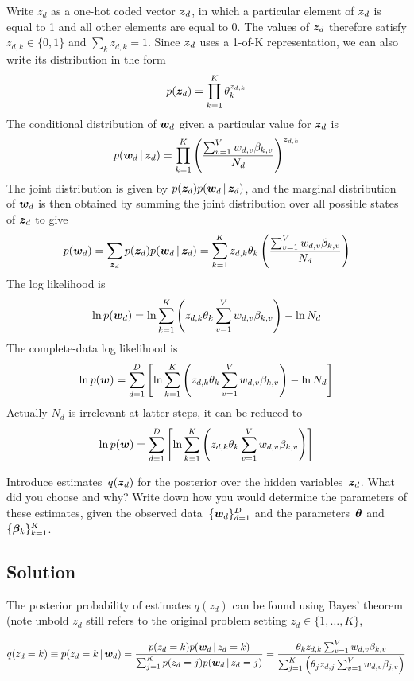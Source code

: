 \documentclass[submit]{harvardml}
\begin{document}
Write $z_d$ as a one-hot coded vector $\boldsymbol{z}_d$, in which a particular element of $\boldsymbol{z}_d$ is equal to 1 and all other elements are equal to 0. The values of $\boldsymbol{z}_d$ therefore satisfy $z_{d,k} \in \{0,1\}$ and $\sum_k z_{d,k} = 1$. Since $\boldsymbol{z}_d$ uses a 1-of-K representation, we can also write its distribution in the form
$$ p(\boldsymbol{z}_d) = \prod_{k=1}^K \theta_k^{z_{d,k}} $$ 
The conditional distribution of $\boldsymbol{w}_d$ given a particular value for $\boldsymbol{z}_d$ is
$$ p(\boldsymbol{w}_d \,|\, \boldsymbol{z}_d) = \prod_{k=1}^K \left( \frac{\sum_{v=1}^V{w_{d,v}\beta_{k,v}}}{N_d} \right)^{z_{d,k}} $$
The joint distribution is given by $p(\boldsymbol{z}_d)p(\boldsymbol{w}_d\,|\,\boldsymbol{z}_d)$, and the marginal distribution of $\boldsymbol{w}_d$ is then obtained by summing the joint distribution over all possible states of $\boldsymbol{z}_d$ to give
$$ p(\boldsymbol{w}_d) = \sum_{\boldsymbol{z}_d} p(\boldsymbol{z}_d)p(\boldsymbol{w}_d\,|\,\boldsymbol{z}_d) = \sum_{k=1}^K z_{d,k} \theta_k \left( \frac{\sum_{v=1}^V{w_{d,v}\beta_{k,v}}}{N_d} \right) $$
The log likelihood is 
$$ \ln p(\boldsymbol{w}_d) = \ln \sum_{k=1}^K \left(z_{d,k} \theta_k \sum_{v=1}^V{w_{d,v}\beta_{k,v}}\right) - \ln N_d $$
The complete-data log likelihood is 
$$ \ln p(\boldsymbol{w}) = \sum_{d=1}^D \left[ \ln \sum_{k=1}^K \left(z_{d,k} \theta_k \sum_{v=1}^V{w_{d,v}\beta_{k,v}}\right) - \ln N_d \right]$$
Actually $N_d$ is irrelevant at latter steps, it can be reduced to 
$$ \ln p(\boldsymbol{w}) = \sum_{d=1}^D \left[ \ln \sum_{k=1}^K \left(z_{d,k} \theta_k \sum_{v=1}^V{w_{d,v}\beta_{k,v}}\right) \right]$$

\newpage
\begin{problem}

Introduce estimates~$q(\boldsymbol{z}_d)$ for the posterior over the hidden variables~$\boldsymbol{z}_d$.  What did you choose and why?  Write down how you would determine the parameters of these estimates, given the observed data~$\{\boldsymbol{w}_d\}^D_{d=1}$ and the parameters~$\boldsymbol{\theta}$ and~$\{\boldsymbol{\beta}_k\}^K_{k=1}$.

\end{problem}
\subsection*{Solution}

The posterior probability of estimates $q(z_d)$ can be found using Bayes' theorem (note unbold $z_d$ still refers to the original problem setting $z_d \in \{1,\dots,K\}$,

$$ q(z_d = k) \equiv p(z_d=k \,|\, \boldsymbol{w}_d) = \frac{p(z_d=k)p(\boldsymbol{w}_d\,|\, z_d=k)}{\sum_{j=1}^Kp(z_d=j)p(\boldsymbol{w}_d\,|\, z_d=j)} = \frac{\theta_k z_{d,k} \sum_{v=1}^V{w_{d,v}\beta_{k,v}} }{\sum_{j=1}^K{\left( \theta_j z_{d,j} \sum_{v=1}^V{w_{d,v}\beta_{j,v}} \right)}} $$
\end{document}
